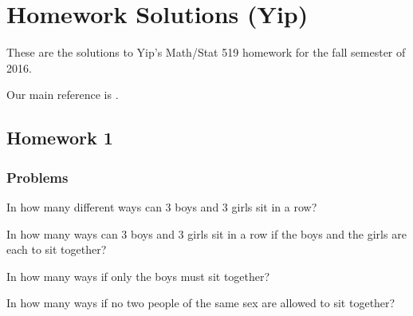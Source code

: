 \section{Homework Solutions (Yip)}
These are the solutions to Yip's Math/Stat 519 homework for the fall
semester of 2016.

Our main reference is \cite{ross}.

\subsection{Homework 1}
\subsubsection{Problems}
\begin{problem}[Ross, \S 1, \# 7]
  \hfill
  \begin{alphlist}
  \item In how many different ways can \(3\) boys and \(3\) girls sit in a
    row?
  \item In how many ways can \(3\) boys and \(3\) girls sit in a row if the
    boys and the girls are each to sit together?
  \item In how many ways if only the boys must sit together?
  \item In how many ways if no two people of the same sex are allowed to
    sit together?
  \end{alphlist}
\end{problem}
